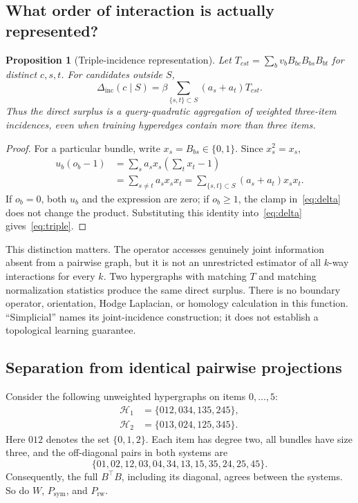 \documentclass[11pt,a4paper]{article}
\newtheorem{proposition}[theorem]{Proposition}
\theoremstyle{remark}
\newcommand{\inc}{\Delta_{\mathrm{inc}}}
\begin{document}
\subsection{What order of interaction is actually represented?}
\begin{proposition}[Triple-incidence representation]
Let $T_{cst}=\sum_b v_b B_{bc}B_{bs}B_{bt}$ for distinct $c,s,t$.
For candidates outside $S$,
\begin{equation}
 \inc(c\mid S)=\beta\sum_{\{s,t\}\subset S}(a_s+a_t)T_{cst}.
 \label{eq:triple}
\end{equation}
Thus the direct surplus is a query-quadratic aggregation of weighted
three-item incidences, even when training hyperedges contain more than
three items.
\end{proposition}
\begin{proof}
For a particular bundle, write $x_s=B_{bs}\in\{0,1\}$.
Since $x_s^2=x_s$,
\begin{align}
 u_b(o_b-1)
 &=\sum_s a_s x_s\left(\sum_t x_t-1\right)\\
 &=\sum_{s\neq t}a_s x_sx_t
 =\sum_{\{s,t\}\subset S}(a_s+a_t)x_sx_t.
\end{align}
If $o_b=0$, both $u_b$ and the expression are zero; if $o_b\geq1$, the
clamp in~\eqref{eq:delta} does not change the product. Substituting this
identity into~\eqref{eq:delta} gives~\eqref{eq:triple}.
\end{proof}
This distinction matters. The operator accesses genuinely joint information
absent from a pairwise graph, but it is not an unrestricted estimator of
all $k$-way interactions for every $k$. Two hypergraphs with matching $T$
and matching normalization statistics produce the same direct surplus.
There is no boundary operator, orientation, Hodge Laplacian, or homology
calculation in this function. ``Simplicial'' names its joint-incidence
construction; it does not establish a topological learning guarantee.

\subsection{Separation from identical pairwise projections}
Consider the following unweighted hypergraphs on items $0,\ldots,5$:
\begin{align}
 \mathcal H_1&=\{012,034,135,245\},\\
 \mathcal H_2&=\{013,024,125,345\}.
 \label{eq:pasch}
\end{align}
Here $012$ denotes the set $\{0,1,2\}$. Each item has degree two, all
bundles have size three, and the off-diagonal pairs in both systems are
\begin{equation*}
 \{01,02,12,03,04,34,13,15,35,24,25,45\}.
\end{equation*}
Consequently, the full $B^\top B$, including its diagonal, agrees between
the systems. So do $W$, $P_{\mathrm{sym}}$, and $P_{\mathrm{rw}}$.
\end{document}
